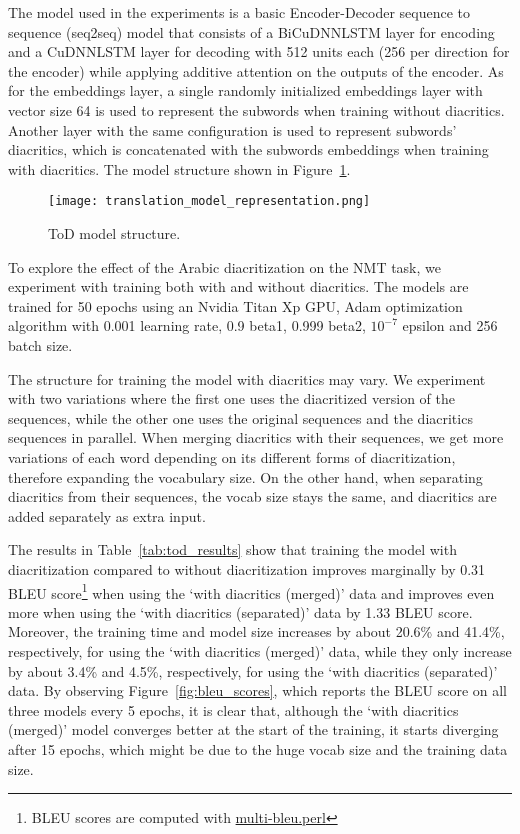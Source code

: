 \documentclass[11pt,a4paper]{article}
\newcommand{\para}[1]{\medskip \noindent {\bf #1}}
\begin{document}
\para{Model Structure}
The model used in the experiments is a basic Encoder-Decoder sequence to sequence (seq2seq) model that consists of a BiCuDNNLSTM layer for encoding and a CuDNNLSTM layer for decoding with 512 units each (256 per direction for the encoder) while applying additive attention \cite{bahdanau2014neural} on the outputs of the encoder. As for the embeddings layer, a single randomly initialized embeddings layer with vector size 64 is used to represent the subwords when training without diacritics. Another layer with the same configuration is used to represent subwords' diacritics, which is concatenated with the subwords embeddings when training with diacritics. The model structure shown in Figure~\ref{fig:tod_structure}.

\begin{figure}[h]
    \centering
    \texttt{[image: translation\_model\_representation.png]}
    \caption{ToD model structure.}
    \label{fig:tod_structure}
\end{figure}

\para{Results and Discussion}
To explore the effect of the Arabic diacritization on the NMT task, we experiment with training both with and without diacritics. The models are trained for 50 epochs using an Nvidia Titan Xp GPU, Adam optimization algorithm with 0.001 learning rate, 0.9 beta1, 0.999 beta2, $10^{-7}$ epsilon and 256 batch size.

The structure for training the model with diacritics may vary. We experiment with two variations where the first one uses the diacritized version of the sequences, while the other one uses the original sequences and the diacritics sequences in parallel. When merging diacritics with their sequences, we get more variations of each word depending on its different forms of diacritization, therefore expanding the vocabulary size. On the other hand, when separating diacritics from their sequences, the vocab size stays the same, and diacritics are added separately as extra input.

The results in Table~\ref{tab:tod_results} show that training the model with diacritization compared to without diacritization improves marginally by 0.31 BLEU score\footnote{BLEU scores are computed with \href{https://github.com/moses-smt/mosesdecoder/blob/master/scripts/generic/multi-bleu.perl}{multi-bleu.perl}}
when using the `with diacritics (merged)' data and improves even more when using the `with diacritics (separated)' data by 1.33 BLEU score. Moreover, the training time and model size increases by about 20.6\% and 41.4\%, respectively, for using the `with diacritics (merged)' data, while they only increase by about 3.4\% and 4.5\%, respectively, for using the `with diacritics (separated)' data. By observing Figure~\ref{fig:bleu_scores}, which reports the BLEU score on all three models every 5 epochs, it is clear that, although the `with diacritics (merged)' model converges better at the start of the training, it starts diverging after 15 epochs, which might be due to the huge vocab size and the training data size.
\end{document}
